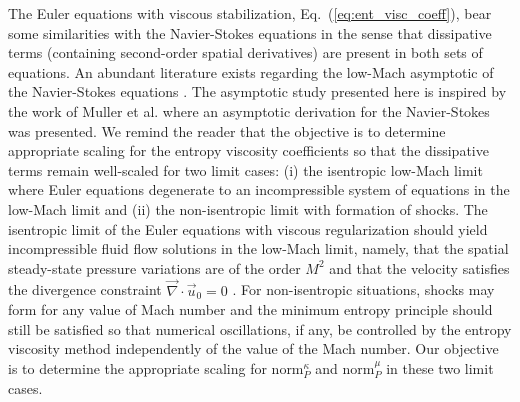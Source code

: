 \documentclass[review,10pt]{elsarticle}
\renewcommand{\div}{\vec{\nabla}\! \cdot \!}
\newcommand{\norm}{\textrm{norm}}
\renewcommand{\Re}{\textrm{Re}}
\newcommand{\Pe}{\textrm{P\'e}}
\newcommand{\eqt}[1]{Eq.~(\ref{#1})}                     %
\begin{document}
The Euler equations with viscous stabilization, \eqt{eq:ent_visc_coeff}, bear some similarities with 
the Navier-Stokes equations in the sense that dissipative terms (containing second-order spatial derivatives) 
are present in both sets of equations. An abundant literature exists regarding the low-Mach asymptotic 
of the Navier-Stokes equations \cite{LowMach1, LowMach2, LowMach3, Muller}.   
%
The asymptotic study presented here is inspired by the work of Muller et al. \cite{Muller} where 
an asymptotic derivation for the Navier-Stokes was presented. 
We remind the reader that the objective is to determine appropriate scaling for the entropy 
viscosity coefficients so that the dissipative terms remain well-scaled for two limit cases: 
(i) the isentropic low-Mach limit where Euler equations degenerate to an incompressible system of 
equations in the low-Mach limit and 
(ii) the non-isentropic limit with formation of shocks. 
The isentropic limit of the Euler equations with viscous regularization should yield incompressible 
fluid flow solutions in the low-Mach limit, namely, that the spatial steady-state pressure variations are of the 
order $M^2$ and that the velocity satisfies the divergence constraint $\div \vec{u}_0 = 0$ 
\cite{LowMach1, LowMach2, LowMach3}. For non-isentropic situations, shocks may form for any 
value of Mach number and the minimum entropy principle should still be satisfied so that numerical 
oscillations, if any, be controlled by the entropy viscosity method independently of the value of the Mach number.
Our objective is to determine the appropriate scaling for $\norm_P^\kappa$ and $\norm_P^\mu$ in these two limit cases.
\end{document}
